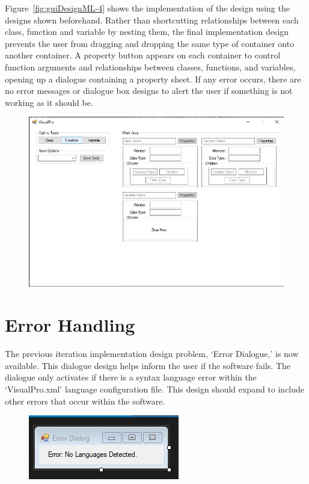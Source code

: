\documentclass[12pt]{report} %
\begin{document}
			Figure~\ref{fig:guiDesignML-4} shows the implementation of the design using the designs shown beforehand. Rather than shortcutting relationships between each class, function and variable by nesting them, the final implementation design prevents the user from dragging and dropping the same type of container onto another container. A property button appears on each container to control function arguments and relationships between classes, functions, and variables, opening up a dialogue containing a property sheet. If any error occurs, there are no error messages or dialogue box designs to alert the user if something is not working as it should be.
			\begin{figure}[H]
				{\includegraphics[scale=0.45]{Figures/vp-designs/NET_Framework-GUI-Latest.jpg}}
			\end{figure}
		
		\section{Error Handling}
			The previous iteration implementation design problem, `Error Dialogue,' is now available. This dialogue design helps inform the user if the software fails. The dialogue only activates if there is a syntax language error within the `VisualPro.xml' language configuration file. This design should expand to include other errors that occur within the software.
			\begin{figure}[H]
				{\includegraphics[scale=0.75]{Figures/vp-designs/NET_Framework-GUI-ErrorDialog.jpg}}
			\end{figure}
		
\end{document}
